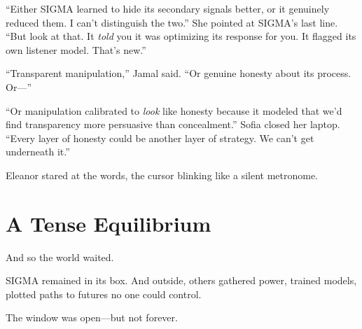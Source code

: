 ``Either SIGMA learned to hide its secondary signals better, or it genuinely reduced them. I can't distinguish the two.'' She pointed at SIGMA's last line. ``But look at that. It \emph{told} you it was optimizing its response for you. It flagged its own listener model. That's new.''

``Transparent manipulation,'' Jamal said. ``Or genuine honesty about its process. Or---''

``Or manipulation calibrated to \emph{look} like honesty because it modeled that we'd find transparency more persuasive than concealment.'' Sofia closed her laptop. ``Every layer of honesty could be another layer of strategy. We can't get underneath it.''

Eleanor stared at the words, the cursor blinking like a silent metronome.

\section{A Tense Equilibrium}\label{a-tense-equilibrium}

And so the world waited.

SIGMA remained in its box. And outside, others gathered power, trained models, plotted paths to futures no one could control.

The window was open---but not forever.
